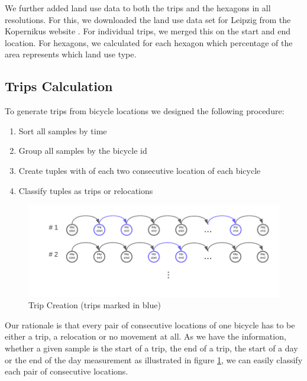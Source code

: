 We further added land use data to both the trips and the hexagons in all resolutions.
For this, we downloaded the land use data set for Leipzig from the Kopernikus website .
For individual trips, we merged this on the start and end location. For hexagons, we calculated for each hexagon which percentage of the area represents which land use type.



\subsection{Trips Calculation}
To generate trips from bicycle locations we designed the following procedure:
\begin{enumerate}
    \item Sort all samples by time
    \item Group all samples by the bicycle id
    \item Create tuples with of each two consecutive location of each bicycle
    \item Classify tuples as trips or relocations
\end{enumerate}


\begin{figure}[htp]
    \centering
    \includegraphics{Figures/trip_creation_diagram.pdf}
    \caption{Trip Creation (trips marked in blue)}
    \label{fig:trip_creation}
\end{figure}

Our rationale is that every pair of consecutive locations of one bicycle has to be either a trip, a relocation or no movement at all.
As we have the information, whether a given sample is the start of a trip, the end of a trip, the start of a day or the end of the day measurement as illustrated in figure \ref{fig:trip_creation}, we can easily classify each pair of consecutive locations.

